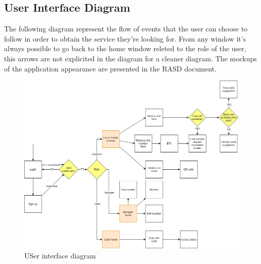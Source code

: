\subsection{User Interface Diagram}

The following diagram represent the flow of events that the user can choose to follow in order to obtain the service they're looking for.
From any window it's always possible to go back to the home window releted to the role of the user, this arrows are not explicited in the diagram for a cleaner diagram.
The mockups of the application appearance are presented in the RASD document.

\begin{figure}[H]
    \centering
    \includegraphics[height=0.4\textwidth]{Images/UXDiagram.png}
    \caption{USer interface diagram}
\end{figure}
